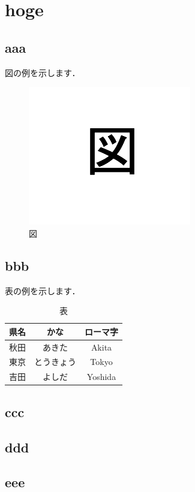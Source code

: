 \documentclass[11pt, dvipdfmx]{jreport}
\begin{document}
\graphicspath{{../figure/}{./figure/}}

\chapter{hoge}
\label{chap:hoge}

\section{aaa}

図の例を示します．

\begin{figure}[htbp]
  \begin{center}
    \includegraphics{figure_example.png}
    \caption{図}
    \label{fig:figure_example}
  \end{center}
\end{figure}

\section{bbb}

表の例を示します．

\begin{table}[htb]
  \begin{center}
    \caption{表}
    \begin{tabular}{|c|c|c|} \hline
      県名 & かな & ローマ字 \\ \hline \hline
      秋田 & あきた & Akita \\
      東京 & とうきょう & Tokyo \\
      吉田 & よしだ & Yoshida \\ \hline
    \end{tabular}
    \label{tab:prefecture}
  \end{center}
\end{table}

\section{ccc}

\section{ddd}

\section{eee}
\end{document}
